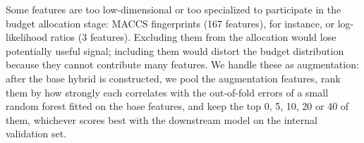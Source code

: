 
Some features are too low-dimensional or too specialized to participate in the budget allocation stage: MACCS fingerprints (167 features), for instance, or log-likelihood ratios (3 features). Excluding them from the allocation would lose potentially useful signal; including them would distort the budget distribution because they cannot contribute many features. We handle these as augmentation: after the base hybrid is constructed, we pool the augmentation features, rank them by how strongly each correlates with the out-of-fold errors of a small random forest fitted on the base features, and keep the top 0, 5, 10, 20 or 40 of them, whichever scores best with the downstream model on the internal validation set.

